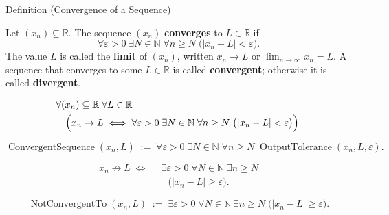 \begin{definitionbox}{Definition (Convergence of a Sequence)}
\begin{definition}
\label{def:convergent-sequence}

Let $(x_n) \subseteq \mathbb{R}$. The sequence $(x_n)$ \textbf{converges}
to $L \in \mathbb{R}$ if
\[
    \forall \varepsilon > 0 \;\exists N \in \mathbb{N} \;\forall n \ge N
    \;\bigl(|x_n - L| < \varepsilon\bigr).
\]
The value $L$ is called the \textbf{limit} of $(x_n)$, written
$x_n \to L$ or $\displaystyle\lim_{n \to \infty} x_n = L$.
A sequence that converges to some $L \in \mathbb{R}$ is called
\textbf{convergent}; otherwise it is called \textbf{divergent}.
\end{definition}
\end{definitionbox}

\begin{remark*}
\[
\begin{aligned}
&\forall (x_n) \subseteq \mathbb{R} \;\forall L \in \mathbb{R}\\
&\quad\Bigl(
    x_n \to L
    \;\Longleftrightarrow\;
    \forall \varepsilon > 0 \;\exists N \in \mathbb{N} \;\forall n \ge N
    \;\bigl(|x_n - L| < \varepsilon\bigr)
\Bigr).
\end{aligned}
\]
\end{remark*}

\begin{remark*}
\[
\operatorname{ConvergentSequence}(x_n, L)
\;:=\;
\forall \varepsilon > 0 \;\exists N \in \mathbb{N} \;\forall n \ge N
\;\operatorname{OutputTolerance}(x_n, L, \varepsilon).
\]
\end{remark*}

\begin{remark*}
\[
\begin{aligned}
x_n \not\to L
\;\Longleftrightarrow\;
&\;\exists \varepsilon > 0 \;\forall N \in \mathbb{N} \;\exists n \ge N\\
&\quad\bigl(|x_n - L| \ge \varepsilon\bigr).
\end{aligned}
\]
\end{remark*}

\begin{remark*}
\[
\operatorname{NotConvergentTo}(x_n,L)
\;:=\;
\exists \varepsilon > 0 \;\forall N \in \mathbb{N} \;\exists n \ge N
\;\bigl(|x_n - L| \ge \varepsilon\bigr).
\]
\end{remark*}

